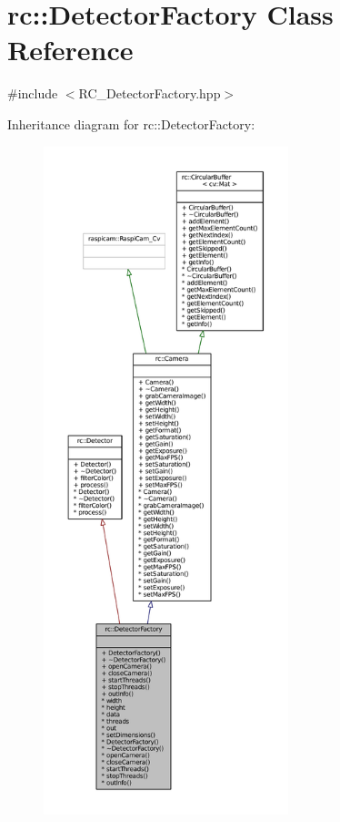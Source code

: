 \hypertarget{classrc_1_1DetectorFactory}{\section{rc\+:\+:Detector\+Factory Class Reference}
\label{classrc_1_1DetectorFactory}
}


{\ttfamily \#include $<$R\+C\+\_\+\+Detector\+Factory.\+hpp$>$}



Inheritance diagram for rc\+:\+:Detector\+Factory\+:\nopagebreak
\begin{figure}[H]
\begin{center}
\leavevmode
\includegraphics[height=550pt]{classrc_1_1DetectorFactory__inherit__graph}
\end{center}
\end{figure}


